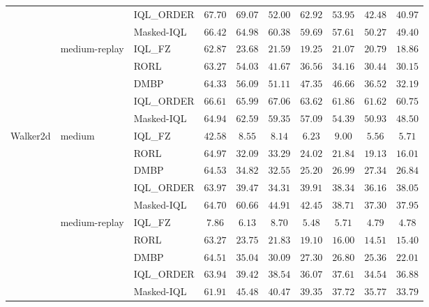 \begin{table}[!htbp]
{\begin{tabular}{lll|ccccccc}
        & & IQL\_ORDER    & $\mathbf{67.70}$ & $\mathbf{69.07}$ & $52.00$ & $\mathbf{62.92}$ & $53.95$ & $42.48$ & $40.97$ \\
        & & Masked-IQL    & $66.42$ & $64.98$ & $\mathbf{60.38}$ & $59.69$ & $\mathbf{57.61}$ & $\mathbf{50.27}$ & $\mathbf{49.40}$ \\
        \cline{2-10}
        & \multirow{5}{*}{medium-replay}
        & IQL\_FZ       & $62.87$ & $23.68$ & $21.59$ & $19.25$ & $21.07$ & $20.79$ & $18.86$ \\
        & & RORL          & $63.27$ & $54.03$ & $41.67$ & $36.56$ & $34.16$ & $30.44$ & $30.15$ \\
        & & DMBP          & $64.33$ & $56.09$ & $51.11$ & $47.35$ & $46.66$ & $36.52$ & $32.19$ \\
        & & IQL\_ORDER    & $\mathbf{66.61}$ & $\mathbf{65.99}$ & $\mathbf{67.06}$ & $\mathbf{63.62}$ & $\mathbf{61.86}$ & $\mathbf{61.62}$ & $\mathbf{60.75}$ \\
        & & Masked-IQL    & $64.94$ & $62.59$ & $59.35$ & $57.09$ & $54.39$ & $50.93$ & $48.50$ \\
        \hline
        \multirow{10}{*}{Walker2d}
        & \multirow{5}{*}{medium}
        & IQL\_FZ       & $42.58$ & $8.55$ & $8.14$ & $6.23$ & $9.00$ & $5.56$ & $5.71$ \\
        & & RORL          & $\mathbf{64.97}$ & $32.09$ & $33.29$ & $24.02$ & $21.84$ & $19.13$ & $16.01$ \\
        & & DMBP          & $64.53$ & $34.82$ & $32.55$ & $25.20$ & $26.99$ & $27.34$ & $26.84$ \\
        & & IQL\_ORDER    & $63.97$ & $39.47$ & $34.31$ & $39.91$ & $38.34$ & $36.16$ & $\mathbf{38.05}$ \\
        & & Masked-IQL    & $64.70$ & $\mathbf{60.66}$ & $\mathbf{44.91}$ & $\mathbf{42.45}$ & $\mathbf{38.71}$ & $\mathbf{37.30}$ & $37.95$ \\
        \cline{2-10}
        & \multirow{5}{*}{medium-replay}
        & IQL\_FZ       & $7.86$ & $6.13$ & $8.70$ & $5.48$ & $5.71$ & $4.79$ & $4.78$ \\
        & & RORL          & $63.27$ & $23.75$ & $21.83$ & $19.10$ & $16.00$ & $14.51$ & $15.40$ \\
        & & DMBP          & $\mathbf{64.51}$ & $35.04$ & $30.09$ & $27.30$ & $26.80$ & $25.36$ & $22.01$ \\
        & & IQL\_ORDER    & $63.94$ & $39.42$ & $38.54$ & $36.07$ & $37.61$ & $34.54$ & $\mathbf{36.88}$ \\
        & & Masked-IQL    & $61.91$ & $\mathbf{45.48}$ & $\mathbf{40.47}$ & $\mathbf{39.35}$ & $\mathbf{37.72}$ & $\mathbf{35.77}$ & $33.79$ \\
        \hline
    \end{tabular}
    }
\end{table}

